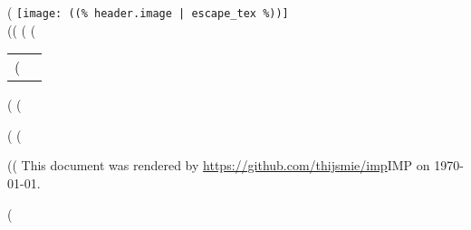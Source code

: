 \documentclass[a4paper]{article}
\begin{document}
(%
    \flushright
    \texttt{[image: ((\% header.image | escape\_tex \%))]} \\
    ((%
    \flushleft
(%
(%
    \begin{tabular}{l l}
        (%
            \textit{ ((%
        (%
    \end{tabular}
(%
\vspace{1cm}
(%


(%
(%
\vfill
\hline
\begin{center}
\footnotesize
((%
This document was rendered by \url{https://github.com/thijsmie/imp}{IMP} on \today.
\end{center}
(%
\end{document}
